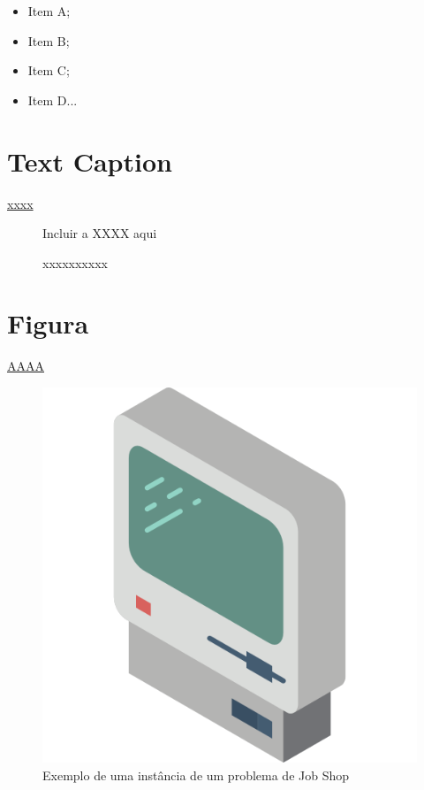 \begin{itemize}
 \item Item A;
 \item Item B;
 \item Item C;
 \item Item D...
\end{itemize}



\section{Text Caption}

\hyperref[fig:xxxx]{xxxx}
\begin{figure}[h]
    \centering
    \small{Incluir a XXXX aqui}
    \label{fig:xxxx}
    \caption{xxxxxxxxxx}
\end{figure}


\section{Figura}


\hyperref[fig:boat1]{AAAA}
\begin{figure}[htb]
    \centering
    \includegraphics[scale=0.20]{assets/072-old-computer}
    \caption{Exemplo de uma instância de um problema de Job Shop} 
    \label{fig:boat1}
\end{figure}


